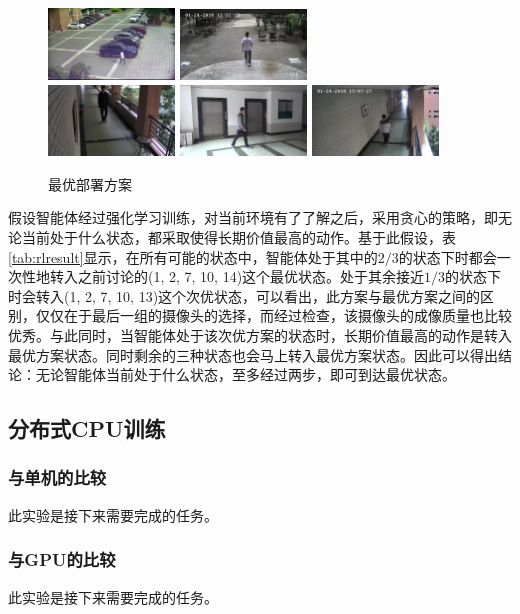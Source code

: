 \begin{figure}
\centering
\includegraphics[width=0.3\textwidth]{figure/1-2}
\includegraphics[width=0.3\textwidth]{figure/1-4}\\
\includegraphics[width=0.3\textwidth]{figure/2-3}
\includegraphics[width=0.3\textwidth]{figure/3-2}
\includegraphics[width=0.3\textwidth]{figure/3-6}
\caption{最优部署方案}
\label{fig:rlresult}
\end{figure}

假设智能体经过强化学习训练，对当前环境有了了解之后，采用贪心的策略，即无论当前处于什么状态，都采取使得长期价值最高的动作。基于此假设，表\ref{tab:rlresult}显示，在所有可能的状态中，智能体处于其中的$2/3$的状态下时都会一次性地转入之前讨论的(1, 2, 7, 10, 14)这个最优状态。处于其余接近$1/3$的状态下时会转入(1, 2, 7, 10, 13)这个次优状态，可以看出，此方案与最优方案之间的区别，仅仅在于最后一组的摄像头的选择，而经过检查，该摄像头的成像质量也比较优秀。与此同时，当智能体处于该次优方案的状态时，长期价值最高的动作是转入最优方案状态。同时剩余的三种状态也会马上转入最优方案状态。因此可以得出结论：无论智能体当前处于什么状态，至多经过两步，即可到达最优状态。

\subsection{分布式CPU训练}

\subsubsection{与单机的比较}

此实验是接下来需要完成的任务。

\subsubsection{与GPU的比较}

此实验是接下来需要完成的任务。